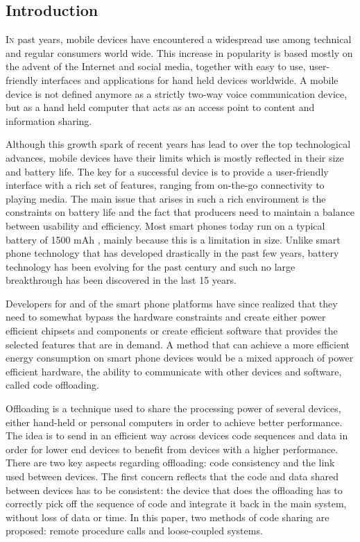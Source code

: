 \documentclass[twoside]{article}
\begin{document}
\begin{multicols}{2}
\section{Introduction}
\label{intro}
\lettrine[nindent=0em,lines=3]{I}n past years, mobile devices have encountered a widespread use among technical and regular consumers world wide. This increase in popularity is based mostly on the advent of the Internet and social media, together with easy to use, user-friendly interfaces and applications for hand held devices worldwide. A mobile device is not defined anymore as a strictly two-way voice communication device, but as a hand held computer that acts as an access point to content and information sharing.

Although this growth spark of recent years has lead to over the top technological advances, mobile devices have their limits which is mostly reflected in their size and battery life. The key for a successful device is to provide a user-friendly interface with a rich set of features, ranging from on-the-go connectivity to playing media. The main issue that arises in such a rich environment is the constraints on battery life and the fact that producers need to maintain a balance between usability and efficiency. Most smart phones today run on a typical battery of 1500 mAh \cite{understandingBattery}, mainly because this is a limitation in size. Unlike smart phone technology that has developed drastically in the past few years, battery technology has been evolving for the past century and such no large breakthrough has been discovered in the last 15 years\cite{batteryLife}.

Developers for and of the smart phone platforms have since realized that they need to somewhat bypass the hardware constraints and create either power efficient chipsets and components or create efficient software that provides the selected features that are in demand. A method that can achieve a more efficient energy consumption on smart phone devices would be a mixed approach of power efficient hardware, the ability to communicate with other devices and software, called code offloading.

Offloading is a technique used to share the processing power of several devices, either hand-held or personal computers in order to achieve better performance. The idea is to send in an efficient way across devices code sequences and data in order for lower end devices to benefit from devices with a higher performance. There are two key aspects regarding offloading: code consistency and the link used between devices. The first concern reflects that the code and data shared between devices has to be consistent: the device that does the offloading has to correctly pick off the sequence of code and integrate it back in the main system, without loss of data or time. In this paper, two methods of code sharing are proposed: remote procedure calls and loose-coupled systems. 


\end{multicols}
\end{document}

